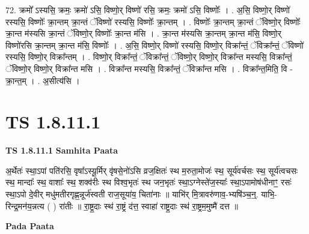 \documentclass[17pt]{extarticle}
\begin{document}
72. क्रमो᳚ ऽस्यसि॒ क्रमः॒ क्रमो॑ ऽसि॒ विष्णो॒र् विष्णो॑ रसि॒ क्रमः॒ क्रमो॑ ऽसि॒ विष्णोः᳚ । . अ॒सि॒ विष्णो॒र् विष्णो॑ रस्यसि॒ विष्णोः᳚ क्रा॒न्तम् क्रा॒न्तं ॅविष्णो॑ रस्यसि॒ विष्णोः᳚ क्रा॒न्तम् । . विष्णोः᳚ क्रा॒न्तम् क्रा॒न्तं ॅविष्णो॒र् विष्णोः᳚ क्रा॒न्त म॑स्यसि क्रा॒न्तं ॅविष्णो॒र् विष्णोः᳚ क्रा॒न्त म॑सि । . क्रा॒न्त म॑स्यसि क्रा॒न्तम् क्रा॒न्त म॑सि॒ विष्णो॒र् विष्णो॑रसि क्रा॒न्तम् क्रा॒न्त म॑सि॒ विष्णोः᳚ । . अ॒सि॒ विष्णो॒र् विष्णो॑ रस्यसि॒ विष्णो॒र् विक्रा᳚न्तं॒ ॅविक्रा᳚न्तं॒ ॅविष्णो॑ रस्यसि॒ विष्णो॒र् विक्रा᳚न्तम् । . विष्णो॒र् विक्रा᳚न्तं॒ ॅविक्रा᳚न्तं॒ ॅविष्णो॒र् विष्णो॒र् विक्रा᳚न्त मस्यसि॒ विक्रा᳚न्तं॒ ॅविष्णो॒र् विष्णो॒र् विक्रा᳚न्त मसि । . विक्रा᳚न्त मस्यसि॒ विक्रा᳚न्तं॒ ॅविक्रा᳚न्त मसि । . विक्रा᳚न्त॒मिति॒ वि - क्रा॒न्त॒म् । . अ॒सीत्य॑सि । \newline
\pagebreak
{}

\section{ TS 1.8.11.1 }

\textbf{TS 1.8.11.1 } \newline
\textbf{Samhita Paata} \newline

अ॒र्थेतः॑ स्था॒ऽपां पति॑रसि॒ वृषा᳚ऽस्यू॒र्मिर् वृ॑षसे॒नो॑ऽसि व्रज॒क्षितः॑ स्थ म॒रुता॒मोजः॑ स्थ॒ सूर्य॑वर्चसः स्थ॒ सूर्य॑त्वचसः स्थ॒ मान्दाः᳚ स्थ॒ वाशाः᳚ स्थ॒ शक्व॑रीः स्थ विश्व॒भृतः॑ स्थ जन॒भृतः॑ स्था॒ऽग्नेस्ते॑ज॒स्याः᳚ स्था॒ऽपामोष॑धीनाꣳ॒॒ रसः॑ स्था॒ऽपो दे॒वीर् मधु॑मतीरगृह्ण॒न्नूर्ज॑स्वती राज॒सूया॑य॒ चिता॑नाः ॥ याभि॑र् मि॒त्रावरु॑णाव॒-भ्यषि॑ञ्च॒न्॒. याभि॒-रिन्द्र॒मन॑य॒न्नत्य ( ) रा॑तीः ॥ रा॒ष्ट्र॒दाः स्थ॑ रा॒ष्ट्रं द॑त्त॒ स्वाहा॑ राष्ट्र॒दाः स्थ॑ रा॒ष्ट्रम॒मुष्मै॑ दत्त ॥ \newline

\textbf{Pada Paata} \newline
\end{document}
